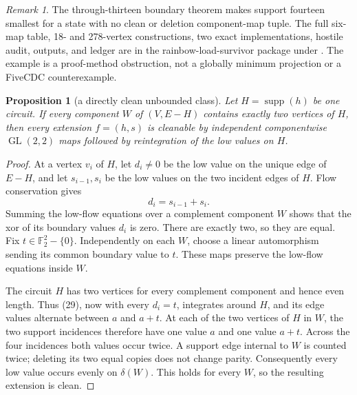 \documentclass[11pt]{article}
\newtheorem{proposition}[theorem]{Proposition}
\theoremstyle{definition}
\theoremstyle{remark}
\newtheorem{remark}[theorem]{Remark}
\newcommand{\F}{\mathbb F}
\newcommand{\supp}{\operatorname{supp}}
\begin{document}
\begin{remark}
The through-thirteen boundary theorem makes support fourteen smallest
for a state with no clean or deletion component-map tuple.  The full
six-map table, 18- and 278-vertex constructions, two exact
implementations, hostile audit, outputs, and ledger are in the
rainbow-load-survivor package under .  The example is a
proof-method obstruction, not a globally minimum projection or a
FiveCDC counterexample.
\end{remark}

\begin{proposition}[a directly clean unbounded class]
\label{prop:twoterminalclean}
Let \(H=\supp(h)\) be one circuit.  If every component \(W\) of
\((V,E-H)\) contains exactly two vertices of \(H\), then every extension
\(f=(h,s)\) is cleanable by independent componentwise
\(\operatorname{GL}(2,2)\) maps followed by reintegration of the low
values on \(H\).
\end{proposition}

\begin{proof}
At a vertex \(v_i\) of \(H\), let \(d_i\ne0\) be the low value on the
unique edge of \(E-H\), and let \(s_{i-1},s_i\) be the low values on the
two incident edges of \(H\).  Flow conservation gives
\[
                         d_i=s_{i-1}+s_i.                    \tag{29}
\]
Summing the low-flow equations over a complement component \(W\) shows
that the xor of its boundary values \(d_i\) is zero.  There are exactly
two, so they are equal.  Fix \(t\in\F_2^2-\{0\}\).  Independently on each
\(W\), choose a linear automorphism sending its common boundary value to
\(t\).  These maps preserve the low-flow equations inside \(W\).

The circuit \(H\) has two vertices for every complement component and
hence even length.  Thus (29), now with every \(d_i=t\), integrates around
\(H\), and its edge values alternate between \(a\) and \(a+t\).
At each of the two vertices of \(H\) in \(W\), the two support incidences
therefore have one value \(a\) and one value \(a+t\).  Across the four
incidences both values occur twice.  A support edge internal to \(W\) is
counted twice; deleting its two equal copies does not change parity.
Consequently every low value occurs evenly on \(\delta(W)\).  This holds
for every \(W\), so the resulting extension is clean.
\end{proof}
\end{document}
